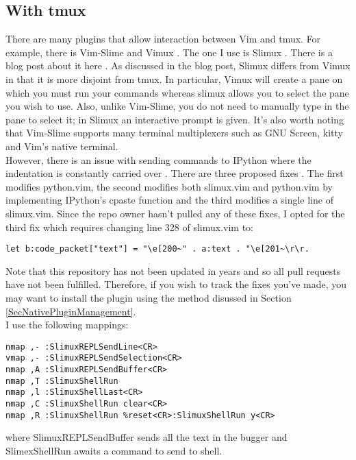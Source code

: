 \documentclass[10pt]{article}
\begin{document}
\subsection{With tmux}
There are many plugins that allow interaction between Vim and tmux. For example, there is Vim-Slime
\cite{jpalardy2012slime} and Vimux \cite{benmills2009vimux}. The one I use is Slimux \cite{esamattis2015slimux}. There
is a blog post about it here \cite{suuronen2012slimux}. As discussed in the blog post, Slimux differs from Vimux in
that it is more disjoint from tmux. In particular, Vimux will create a pane on which you must run your commands whereas
slimux allows you to select the pane you wish to use. Also, unlike Vim-Slime, you do not need to manually type in the
pane to select it; in Slimux an interactive prompt is given. It's also worth noting that Vim-Slime supports many
terminal multiplexers such as GNU Screen, kitty and Vim's native terminal.\\

However, there is an issue with sending commands to IPython where the indentation is constantly carried over
\cite{kmARC2015indentationerror}. There are three proposed fixes
\cite{lotabout2017remove,karadaharu2016add,zcesur2018fix}. The first modifies python.vim, the second modifies both
slimux.vim and python.vim by implementing IPython's cpaste function and the third modifies a single line of slimux.vim.
Since the repo owner hasn't pulled any of these fixes, I opted for the third fix which requires changing line 328 of
slimux.vim to:
\begin{lstlisting}
let b:code_packet["text"] = "\e[200~" . a:text . "\e[201~\r\r.
\end{lstlisting}
Note that this repository has not been updated in years and so all pull requests have not been fulfilled. Therefore, if
you wish to track the fixes you've made, you may want to install the plugin using the method disussed in Section
\ref{SecNativePluginManagement}.\\

I use the following mappings:
\begin{lstlisting}
nmap ,- :SlimuxREPLSendLine<CR>
vmap ,- :SlimuxREPLSendSelection<CR>
nmap ,A :SlimuxREPLSendBuffer<CR>
nmap ,T :SlimuxShellRun 
nmap ,l :SlimuxShellLast<CR>
nmap ,C :SlimuxShellRun clear<CR>
nmap ,R :SlimuxShellRun %reset<CR>:SlimuxShellRun y<CR>
\end{lstlisting}
where SlimuxREPLSendBuffer sends all the text in the bugger and SlimexShellRun awaits a command to send to shell.
\end{document}
